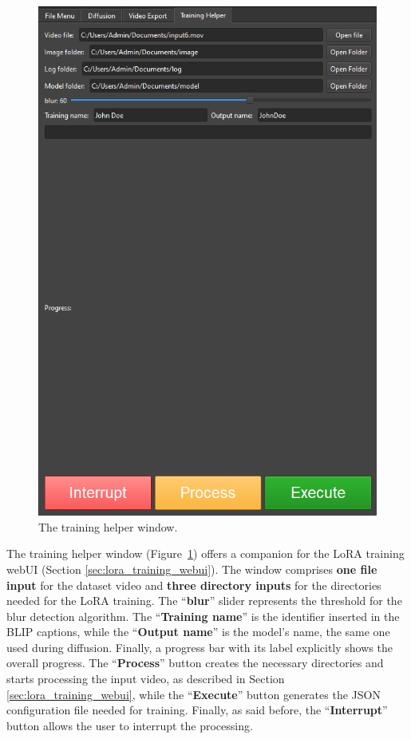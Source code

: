 \documentclass[preprint]{elsarticle}
\begin{document}
\begin{figure}[H]
	\centering
	\includegraphics[scale=0.5, keepaspectratio]{img/project_img/training-help.png}
	\caption{The training helper window.}\label{fig:training-helper}
\end{figure}




The training helper window (Figure~\ref{fig:training-helper}) offers a companion for the LoRA training webUI (Section \ref{sec:lora_training_webui}). The window comprises \textbf{one file input} for the dataset video and \textbf{three directory inputs}  for the directories needed for the LoRA training. The ``\textbf{blur}'' slider represents the threshold for the blur detection algorithm. The ``\textbf{Training name}'' is the identifier inserted in the BLIP captions, while the ``\textbf{Output name}'' is the model's name, the same one used during diffusion. Finally, a progress bar with its label explicitly shows the overall progress. The ``\textbf{Process}'' button creates the necessary directories and starts processing the input video, as described in Section \ref{sec:lora_training_webui}, while the ``\textbf{Execute}'' button generates the  JSON configuration file needed for training. Finally, as said before, the ``\textbf{Interrupt}'' button allows the user to interrupt the processing.
\end{document}
